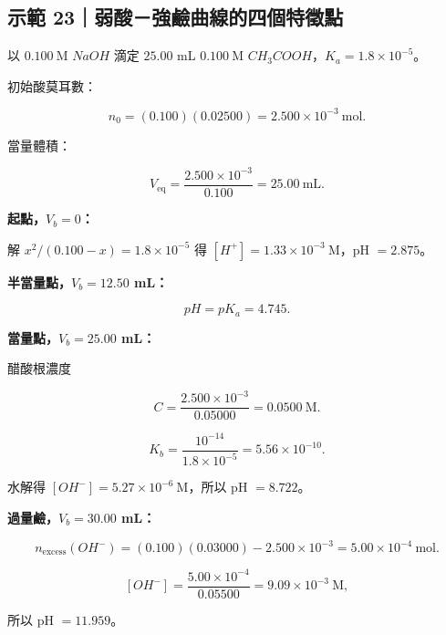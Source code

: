 \documentclass[11pt,a4paper]{article}
\begin{document}
\begin{HandoutWorkedExample}

\subsection{示範 23｜弱酸－強鹼曲線的四個特徵點}\label{ux793aux7bc4-23ux5f31ux9178ux5f37ux9e7cux66f2ux7ddaux7684ux56dbux500bux7279ux5fb5ux9ede}

以 \(0.100\ \mathrm M\) \(NaOH\) 滴定 \(25.00\) mL
\(0.100\ \mathrm M\) \(CH_3COOH\)，\(K_a=1.8\times10^{-5}\)。

初始酸莫耳數：

\[
n_0=(0.100)(0.02500)=2.500\times10^{-3}\ \mathrm{mol}.
\]

當量體積：

\[
V_{\mathrm{eq}}=\frac{2.500\times10^{-3}}{0.100}
=25.00\ \mathrm{mL}.
\]

\textbf{起點，\(V_b=0\)：}

解 \(x^2/(0.100-x)=1.8\times10^{-5}\) 得
\([H^+]=1.33\times10^{-3}\ \mathrm M\)，pH \(=2.875\)。

\textbf{半當量點，\(V_b=12.50\) mL：}

\[
pH=pK_a=4.745.
\]

\textbf{當量點，\(V_b=25.00\) mL：}

醋酸根濃度

\[
C=\frac{2.500\times10^{-3}}{0.05000}
=0.0500\ \mathrm M.
\]

\[
K_b=\frac{10^{-14}}{1.8\times10^{-5}}
=5.56\times10^{-10}.
\]

水解得 \([OH^-]=5.27\times10^{-6}\ \mathrm M\)，所以 pH \(=8.722\)。

\textbf{過量鹼，\(V_b=30.00\) mL：}

\[
n_{\mathrm{excess}}(OH^-)
=(0.100)(0.03000)-2.500\times10^{-3}
=5.00\times10^{-4}\ \mathrm{mol}.
\]

\[
[OH^-]=\frac{5.00\times10^{-4}}{0.05500}
=9.09\times10^{-3}\ \mathrm M,
\]

所以 pH \(=11.959\)。

\end{HandoutWorkedExample}
\end{document}
